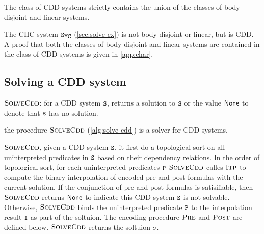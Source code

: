 \begin{thm}
	\label{thm:cdd-contains}
  The class of CDD systems strictly contains the union of the classes
  of body-disjoint and linear systems.
\end{thm}
%
The CHC system $\mcchc$ (\autoref{sec:solve-ex}) is not body-disjoint
or linear, but is CDD.
%
A proof that both the classes of body-disjoint and linear systems are
contained in the class of CDD systems is given in \autoref{app:char}.

\subsection{Solving a CDD system}
\label{sec:solve-cdd}

\begin{algorithm}[t]
  \caption{$\textsc{SolveCdd}$: for a CDD system $\cc{S}$, returns a
    solution to $\cc{S}$ or the value $\mathsf{None}$ to denote that
    $\cc{S}$ has no solution.}
  \label{alg:solve-cdd}
\end{algorithm}


the procedure $\textsc{SolveCdd}$ (\autoref{alg:solve-cdd}) is a solver for CDD systems.
%

$\textsc{SolveCdd}$, given a CDD system $\cc{S}$, it first do a topological sort on all
uninterpreted predicates in $\cc{S}$ based on their dependency relations.
%
In the order of topological sort, for each uninterpreted predicates $\cc{P}$ 
 $\textsc{SolveCdd}$ calles $\textsc{Itp}$ to compute the binary interpolation of 
 encoded pre and post formulas with the current solution.
 If the conjunction of pre and post formulas is satisifiable, then $\textsc{SolveCdd}$
 returns $\mathsf{None}$ to indicate this CDD system $\cc{S}$ is not solvable.
 Otherwise, $\textsc{SolveCdd}$ binds the uninterpreted predicate $\cc{P}$ to the
 interpolation result $\cc{I}$ as part of the soltuion.
 The encoding procedure $\textsc{Pre}$ and $\textsc{Post}$ are defined below.
 $\textsc{SolveCdd}$ returns the soltuion $\sigma$. 

